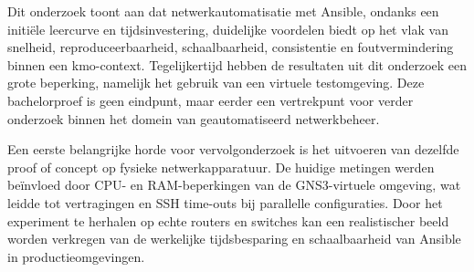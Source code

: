 Dit onderzoek toont aan dat netwerkautomatisatie met Ansible, ondanks een initiële leercurve en tijdsinvestering, duidelijke voordelen biedt op het vlak van snelheid, reproduceerbaarheid, schaalbaarheid, consistentie en foutvermindering binnen een kmo-context. 
Tegelijkertijd hebben de resultaten uit dit onderzoek een grote beperking, namelijk het gebruik van een virtuele testomgeving. 
Deze bachelorproef is geen eindpunt, maar eerder een vertrekpunt voor verder onderzoek binnen het domein van geautomatiseerd netwerkbeheer.
\vspace{1em}

Een eerste belangrijke horde voor vervolgonderzoek is het uitvoeren van dezelfde proof of concept op fysieke netwerkapparatuur. 
De huidige metingen werden beïnvloed door CPU- en RAM-beperkingen van de GNS3-virtuele omgeving, wat leidde tot vertragingen en SSH time-outs bij parallelle configuraties. 
Door het experiment te herhalen op echte routers en switches kan een realistischer beeld worden verkregen van de werkelijke tijdsbesparing en schaalbaarheid van Ansible in productieomgevingen.
\vspace{1em}


